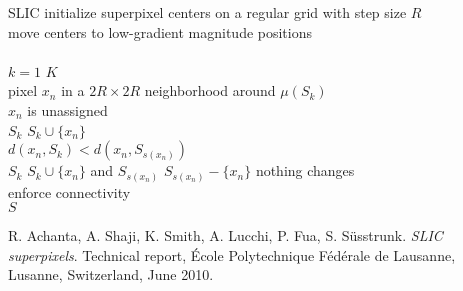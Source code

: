 \documentclass[12pt,a4paper]{article}
\begin{document}
	\begin{algorithm}[t!]
		\begin{algo}{SLIC}{\label{algo:superpixel-segmentation-slic}}
			initialize superpixel centers on a regular grid with step size $R$\\
			move centers to low-gradient magnitude positions\\
			\qrepeat\\
				\qfor $k = 1$ \qto $K$\\
					\qforeach pixel $x_n$ in a $2R \times 2R$ neighborhood around $\mu(S_k)$\\
						\qif $x_n$ is unassigned\\
							\qthen $S_k$ \qlet $S_k \cup \{x_n\}$\qfi\\
						\qelseif $d(x_n, S_k) < d(x_n, S_{s(x_n)})$\\
							\qthen $S_k$ \qlet $S_k \cup \{x_n\}$ and $S_{s(x_n)}$ \qlet $S_{s(x_n)} - \{x_n\}$\qfi\qrof\qrof
			\quntil nothing changes \\
			enforce connectivity\\
			\qreturn $S$
		\end{algo}
		\caption[The basic algorithm of \textbf{SLIC} \cite{AchantaShajiSmithLucchiFuaSuesstrunk}.]{\textbf{SLIC} is implemented as local $K$-means clustering. Here, local means that for each superpixel only pixels in a $2R \times 2R$ window around the superpixel's center are of interest. After clustering, \textbf{SLIC} needs to enforce connectivity.}
		\label{fig:superpixel-segmentation-slic-algorithm}
	\end{algorithm}

	\begin{thebibliography}{1}
		R. Achanta, A. Shaji, K. Smith, A. Lucchi, P. Fua, S. Süsstrunk.
		\emph{SLIC superpixels}.
		Technical report, École Polytechnique Fédérale de Lausanne, Lusanne, Switzerland, June 2010.
	\end{thebibliography}
\end{document}
